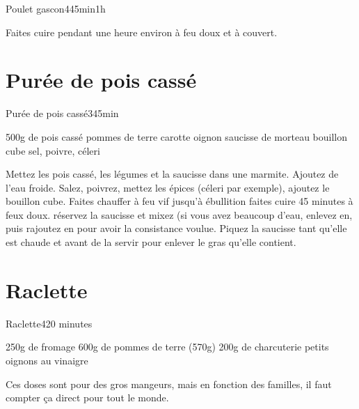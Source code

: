 {\begin{recette}{Poulet gascon}{4}{45min}{1h}
\begin{cuisson}
Faites cuire pendant une heure environ à feu doux et à couvert.
\end{cuisson}

\end{recette}

\section{Purée de pois cassé}
\begin{recette}{Purée de pois cassé}{3}{45min}{}

\begin{ingredients}
\ingredient 500g de pois cassé
 pommes de terre
 carotte
 oignon
 saucisse de morteau
 bouillon cube
\ingredient sel, poivre, céleri
\end{ingredients}

\begin{preparation}
\etape Mettez les pois cassé, les légumes et la saucisse dans une marmite. Ajoutez de l'eau froide. Salez, poivrez, mettez les 
épices (céleri par exemple), ajoutez le bouillon cube. 
\etape Faites chauffer à feu vif jusqu'à ébullition
\etape faites cuire 45 minutes à feux doux.
\etape réservez la saucisse et mixez (si vous avez beaucoup d'eau, enlevez en, puis rajoutez en pour avoir la consistance 
voulue.
\etape Piquez la saucisse tant qu'elle est chaude et avant de la servir pour enlever le gras qu'elle contient. 
\end{preparation}

\end{recette}


\section{Raclette}
\begin{recette}{Raclette}{4}{20 minutes}{}
\begin{ingredients}
\ingredient 250g de fromage
\ingredient 600g de pommes de terre (570g)
\ingredient 200g de charcuterie
\ingredient petits oignons au vinaigre
\begin{remarque}
 Ces doses sont pour des gros mangeurs, mais en fonction des familles, il faut compter ça direct pour tout le monde.
\end{remarque}


\end{ingredients}
\end{recette}}
